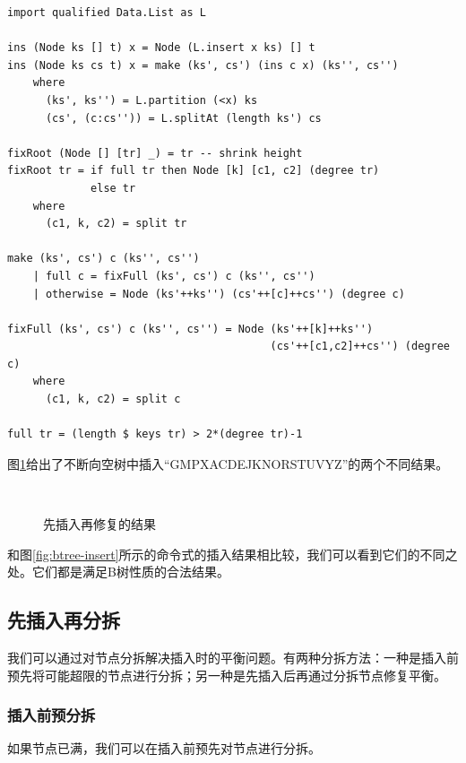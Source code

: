 \documentclass{ctexart}
\begin{document}
\lstset{language=Haskell}
\begin{lstlisting}[style=Haskell]
import qualified Data.List as L

ins (Node ks [] t) x = Node (L.insert x ks) [] t
ins (Node ks cs t) x = make (ks', cs') (ins c x) (ks'', cs'')
    where
      (ks', ks'') = L.partition (<x) ks
      (cs', (c:cs'')) = L.splitAt (length ks') cs

fixRoot (Node [] [tr] _) = tr -- shrink height
fixRoot tr = if full tr then Node [k] [c1, c2] (degree tr)
             else tr
    where
      (c1, k, c2) = split tr

make (ks', cs') c (ks'', cs'')
    | full c = fixFull (ks', cs') c (ks'', cs'')
    | otherwise = Node (ks'++ks'') (cs'++[c]++cs'') (degree c)

fixFull (ks', cs') c (ks'', cs'') = Node (ks'++[k]++ks'')
                                         (cs'++[c1,c2]++cs'') (degree c)
    where
      (c1, k, c2) = split c

full tr = (length $ keys tr) > 2*(degree tr)-1
\end{lstlisting}

图\ref{fig:btree-insert-fp}给出了不断向空树中插入“GMPXACDEJKNORSTUVYZ”的两个不同结果。

\begin{figure}[htbp]
  \centering
   \\
    \caption{先插入再修复的结果} \label{fig:btree-insert-fp}
\end{figure}

和图\ref{fig:btree-insert}所示的命令式的插入结果相比较，我们可以看到它们的不同之处。它们都是满足B树性质的合法结果。

\subsection{先插入再分拆}

我们可以通过对节点分拆解决插入时的平衡问题。有两种分拆方法：一种是插入前预先将可能超限的节点进行分拆；另一种是先插入后再通过分拆节点修复平衡。

\subsubsection{插入前预分拆}

如果节点已满，我们可以在插入前预先对节点进行分拆。
\end{document}
